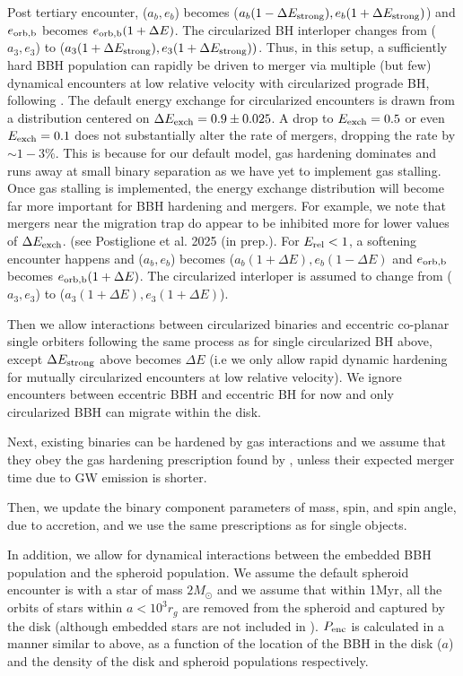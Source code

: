  Post tertiary encounter, ($a_{b},e_{b}$) becomes ($a_{b}(1-\Delta E_{\rm strong}), e_{b}(1+\Delta E_{\rm strong})$)  and $e_{\rm orb,b}$ becomes $e_{\rm orb,b}(1+\Delta E)$.
 The circularized BH interloper changes from ($a_{3},e_{3}$) to ($a_{3}(1+\Delta E_{\rm strong}),e_{3}(1+\Delta E_{\rm strong}))$.
 Thus, in this setup, a sufficiently hard BBH population can rapidly be driven to merger via multiple (but few) dynamical encounters at low relative velocity with circularized prograde BH, following \citet{Leigh+18}.
 The default energy exchange for circularized encounters is drawn from a distribution centered on $\Delta E_{\rm exch}= 0.9 \pm 0.025$.
A drop to $E_{\rm exch} =0.5$ or even $E_{\rm exch}=0.1$ does not substantially alter the rate of mergers, dropping the rate by $\sim 1-3\%$.
This is because for our default model, gas hardening dominates and runs away at small binary separation as we have yet to implement gas stalling.
Once gas stalling is implemented, the energy exchange distribution will become far more important for BBH hardening and mergers.
For example, we note that mergers near the migration trap do appear to be inhibited more for lower values of $\Delta E_{\rm exch}$. (see Postiglione et al. 2025 (in prep.).
For $E_{\rm rel} <1$, a softening encounter happens and ($a_{b},e_{b}$) becomes ($a_{b} (1 + \Delta E),e_{b}(1-\Delta E)$ and $e_{\rm orb,b}$ becomes $e_{\rm orb,b}(1+\Delta E)$.
The circularized interloper is assumed to change from ($a_{3},e_{3}$) to ($a_{3}(1+\Delta E),e_{3}(1+\Delta E)$). 
 
 Then we allow interactions between circularized binaries and eccentric co-planar single orbiters following the same process as for single circularized BH above, except $\Delta E_{\rm strong}$ above becomes $\Delta E$ (i.e we only allow rapid dynamic hardening for mutually circularized encounters at low relative velocity).
We ignore encounters between eccentric BBH and eccentric BH for now and only circularized BBH can migrate within the disk. 

Next, existing binaries can be hardened by gas interactions and we assume that they obey the gas hardening prescription found by \cite{Baruteau11}, unless their expected merger time due to GW emission \citep[computed using][]{Peters64} is shorter. 

Then, we update the binary component parameters of mass, spin, and spin angle, due to accretion, and we use the same prescriptions as for single objects.

In addition, we allow for dynamical interactions between the embedded BBH population and the spheroid population.
We assume the default spheroid encounter is with a star of mass $2M_{\odot}$ and we assume that within 1Myr, all the orbits of stars within $a<10^{3}r_{g}$ are removed from the spheroid and captured by the disk (although embedded stars are not included in ).
$P_{\rm enc}$ is calculated in a manner similar to above, as a function of the location of the BBH in the disk ($a$) and the density of the disk and spheroid populations respectively. 

